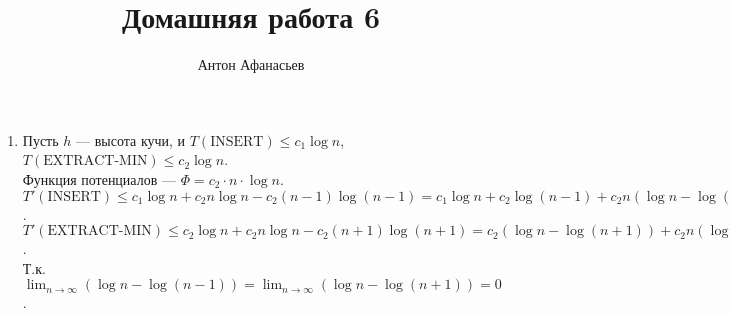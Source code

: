 \documentclass[10pt]{article}
\begin{document}
\title{Домашняя работа 6}
\author{Антон Афанасьев}
\maketitle

\begin{enumerate}

	\item Пусть $h$ --- высота кучи, и $T(\text{INSERT}) \le c_1 \log n$, $T(\text{EXTRACT-MIN}) \le c_2 \log n$.\\
	Функция потенциалов --- $\Phi = c_2 \cdot n \cdot \log n$.\\
	$T'(\text{INSERT}) \le  c_1 \log n + c_2 n \log n - c_2  (n-1)  \log (n-1) = c_1 \log n + c_2 \log (n-1) + c_2 n (\log n - \log (n-1)) \Rightarrow T'(\text{INSERT})= O(\log n)$.\\
	$T'(\text{EXTRACT-MIN}) \le c_2 \log n + c_2 n \log n - c_2 (n+1) \log (n+1) = c_2 (\log n - \log (n+1)) + c_2 n (\log n - \log (n+1)) \Rightarrow  T'(\text{EXRACT-MIN})=O(1)$.\\
	Т.к. $\lim_{n \to \infty }(\log n - \log (n-1)) = \lim_{n \to \infty}( \log n - \log (n+1)) = 0$.
	

\end{enumerate}
\end{document}

